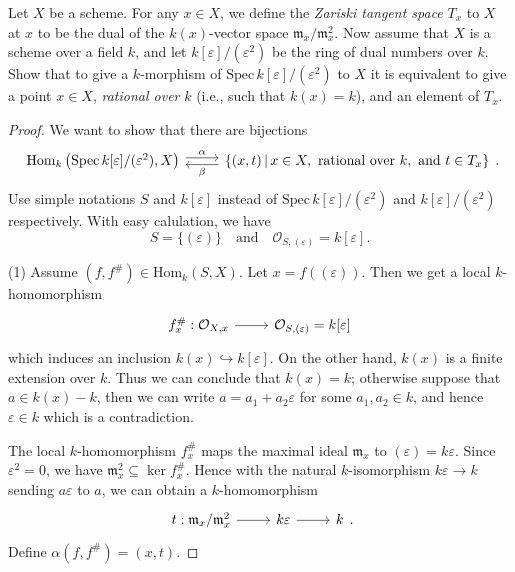\begin{exe}
	\label{2.2.8}
	Let $X$ be a scheme. For any $x\in X$, we define the \emph{Zariski tangent space} $T_x$ to $X$ at $x$ to be the dual of the $k(x)$-vector space $\mathfrak{m}_x/\mathfrak{m}_x^2$. Now assume that $X$ is a scheme over a field $k$, and let $k[\varepsilon]/(\varepsilon^2)$ be the ring of dual numbers over $k$. Show that to give a $k$-morphism of $\mathrm{Spec}\,k[\varepsilon]/(\varepsilon^2)$ to $X$ it is equivalent to give a point $x\in X$, \emph{rational over} $k$ (i.e., such that $k(x)=k$), and an element of $T_x$.
\end{exe}

\begin{proof}
	We want to show that there are bijections
	\begin{equation*}
		\begin{tikzcd}
			{\mathrm{Hom}_k\left(\mathrm{Spec}\,k[\varepsilon]/(\varepsilon^2),X\right)} \arrow[r, "\alpha", shift left] & {\{(x,t)\,|\,x\in X,\ \text{rational over }k ,\ \text{and }t\in T_x \}} \arrow[l, "\beta", shift left]
		\end{tikzcd}.
	\end{equation*}
	Use simple notations $S$ and $k[\varepsilon]$ instead of $\mathrm{Spec}\,k[\varepsilon]/(\varepsilon^2)$ and $k[\varepsilon]/(\varepsilon^2)$ respectively. With easy calulation, we have$$S=\{(\varepsilon)\}\quad\text{and}\quad\mathcal{O}_{S,(\varepsilon)}=k[\varepsilon].$$
	
	(1) Assume $(f,f^\#)\in\mathrm{Hom}_k(S,X)$. Let $x=f((\varepsilon))$. Then we get a local $k$-homomorphism
	\begin{equation*}
		\begin{tikzcd}
			{f^\#_x:\mathcal{O}_{X,x}} \arrow[r] & {\mathcal{O}_{S,(\varepsilon)}=k[\varepsilon]}
		\end{tikzcd}
	\end{equation*}
	which induces an inclusion $k(x)\hookrightarrow k[\varepsilon]$. On the other hand, $k(x)$ is a finite extension over $k$. Thus we can conclude that $k(x)=k$; otherwise suppose that $a\in k(x)-k$, then we can write $a=a_1+a_2\varepsilon$ for some $a_1,a_2\in k$, and hence $\varepsilon\in k$ which is a contradiction.
	
	The local $k$-homomorphism $f_x^\#$ maps the maximal ideal $\mathfrak{m}_x$ to $(\varepsilon)=k\varepsilon$. Since $\varepsilon^2=0$, we have $\mathfrak{m}_x^2\subseteq\ker f^\#_x$. Hence with the natural $k$-isomorphism $k\varepsilon\to k$ sending $a\varepsilon$ to $a$, we can obtain a $k$-homomorphism
	\begin{equation*}
		\begin{tikzcd}
			t:\mathfrak{m}_x/\mathfrak{m}_x^2 \arrow[r] & k\varepsilon \arrow[r] & k
		\end{tikzcd}.
	\end{equation*}
	Define $\alpha(f,f^\#)=(x,t)$.
	

\end{proof}
